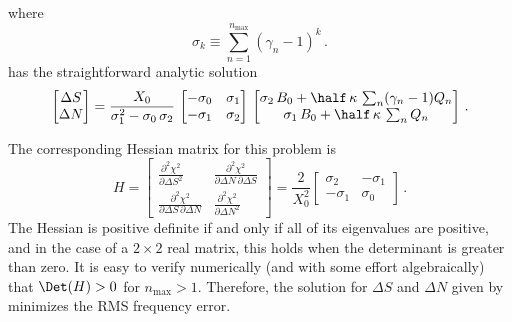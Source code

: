 where
 \begin{equation}
\sigma_k \equiv \sum_{n = 1}^{n_\text{max}} \left(\gamma_n - 1\right)^k\, .
 \end{equation}
 has the straightforward analytic solution
 \begin{equation}\label{eqn:rms_sol}
\begin{bmatrix}
  \Delta S \\
  \Delta N
\end{bmatrix} = \frac{X_0}{\sigma_1^2 - \sigma_0\, \sigma_2}\,
\begin{bmatrix}
  -\sigma_0 & \sigma_1 \\
  -\sigma_1 & \sigma_2
\end{bmatrix}\,
\begin{bmatrix}
  \sigma_2\, B_0 +  \half\, \kappa\, \sum_n (\gamma_n - 1) Q_n\\
  \sigma_1\, B_0 +  \half\, \kappa\, \sum_n Q_n
\end{bmatrix}\, .
 \end{equation}

The corresponding Hessian matrix for this problem is
 \begin{equation}
H = \begin{bmatrix}
      \frac{\partial^2 \chi^2}{\partial \Delta S^2} & \frac{\partial^2 \chi^2}{\partial \Delta N\, \partial \Delta S} \\
      \frac{\partial^2 \chi^2}{\partial \Delta S\, \partial \Delta N} & \frac{\partial^2 \chi^2}{\partial \Delta N^2}
    \end{bmatrix}
  = \frac{2}{X_0^2} \begin{bmatrix}
      \sigma_2 & -\sigma_1 \\
      -\sigma_1 & \sigma_0
    \end{bmatrix}\, .
 \end{equation}
The Hessian is positive definite if and only if all of its eigenvalues are positive, and in the case of a $2 \times 2$ real matrix, this holds when the determinant is greater than zero. It is easy to verify numerically (and with some effort algebraically) that $\Det(H) > 0$ for $n_\text{max} > 1$. Therefore, the solution for $\Delta S$ and $\Delta N$ given by  minimizes the RMS frequency error. 